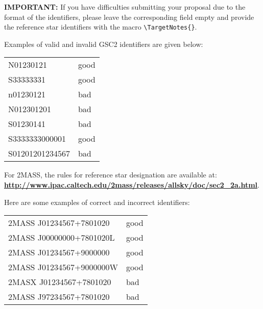 \documentclass{article}
\begin{document}
\smallskip

{\bf IMPORTANT:} If you have difficulties submitting your proposal due to the format of the identifiers, please leave the corresponding field empty and provide the reference star  identifiers with the macro \verb|\TargetNotes{}|.

\smallskip

Examples of valid and invalid GSC2 identifiers are given below:

\begin{center}
\begin{tabular}{ll}
    N01230121           & good\\
    S33333331           & good\\
    n01230121           & bad\\
    N012301201          & bad\\
    S01230141           & bad\\
    S3333333000001      & good\\
    S01201201234567     & bad\\
\end{tabular}
\end{center}


For 2MASS, the rules for reference star designation are available at:\\
\href{http://www.ipac.caltech.edu/2mass/releases/allsky/doc/sec2_2a.html}{\bf
\underline{http://www.ipac.caltech.edu/2mass/releases/allsky/doc/sec2\_2a.html}}. 

\smallskip

Here are some examples of correct and incorrect identifiers:

\begin{center}
\begin{tabular}{ll}
 2MASS J01234567+7801020      & good\\
 2MASS J00000000+7801020L     & good\\
 2MASS J01234567+9000000      & good\\
 2MASS J01234567+9000000W     & good\\
 2MASX J01234567+7801020      & bad\\
 2MASS J97234567+7801020      & bad\\
\end{tabular}
\end{center}
\end{document}
